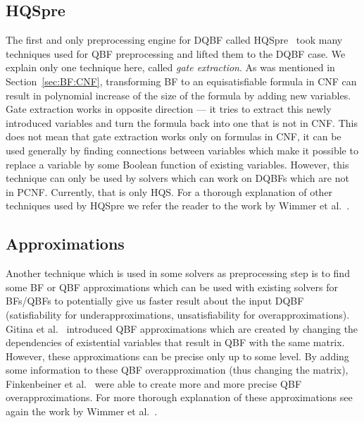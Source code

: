 \documentclass[
  digital, %
  twoside, %
  table,   %
  nolof,     %
  nolot,     %
]{fithesis3}
\theoremstyle{definition}
\theoremstyle{remark}
\begin{document}
\subsection{HQSpre}
\label{sec:HQSpre}
The first and only preprocessing engine for DQBF called HQSpre~\cite{HQSpre1,HQSpre2,HQSpreJournal} took many techniques used for QBF preprocessing and lifted them to the DQBF case. We explain only one technique here, called \emph{gate extraction}. As was mentioned in Section~\ref{sec:BF:CNF}, transforming BF to an equisatisfiable formula in CNF can result in polynomial increase of the size of the formula by adding new variables. Gate extraction works in opposite direction --- it tries to extract this newly introduced variables and turn the formula back into one that is not in CNF. This does not mean that gate extraction works only on formulas in CNF, it can be used generally by finding connections between variables which make it possible to replace a variable by some Boolean function of existing variables. However, this technique can only be used by solvers which can work on DQBFs which are not in PCNF. Currently, that is only HQS. For a thorough explanation of other techniques used by HQSpre we refer the reader to the work by Wimmer et al.~\cite{HQSpreJournal}. 

\subsection{Approximations}
Another technique which is used in some solvers as preprocessing step is to find some BF or QBF approximations which can be used with existing solvers for BFs/QBFs to potentially give us faster result about the input DQBF (satisfiability for underapproximations, unsatisfiability for overapproximations). Gitina et al.~\cite{HQSsimpleAlg} introduced QBF approximations which are created by changing the dependencies of existential variables that result in QBF with the same matrix. However, these approximations can be precise only up to some level. By adding some information to these QBF overapproximation (thus changing the matrix), Finkenbeiner et al.~\cite{FastDQBFRefutation} were able to create more and more precise QBF overapproximations. For more thorough explanation of these approximations see again the work by Wimmer et al.~\cite[Section~3]{HQSpreJournal}.
\end{document}
